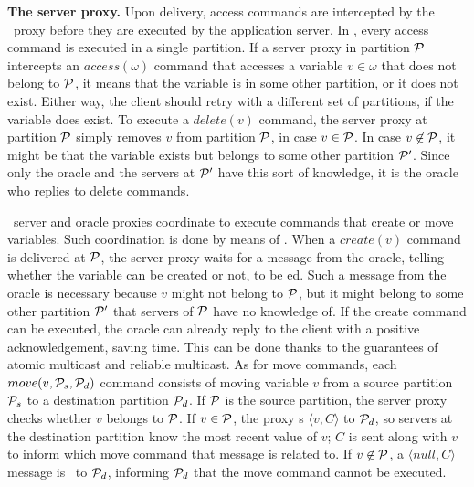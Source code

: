 

\textbf{The server proxy.} Upon delivery, access commands are intercepted by the \dssmr\ proxy before they are executed by the application server.
In \dssmr{}, every access command is executed in a single partition.
If a server proxy in partition $\mathcal{P}$ intercepts an $access(\omega)$ command that accesses a variable $v \in \omega$ that does not belong to $\mathcal{P}$, it means that the variable is in some other partition, or it does not exist.
Either way, the client should retry with a different set of partitions, if the variable does exist.
To execute a $delete(v)$ command, the server proxy at partition $\mathcal{P}$ simply removes $v$ from partition $\mathcal{P}$, in case $v \in \mathcal{P}$.
In case $v \not\in \mathcal{P}$, it might be that the variable exists but belongs to some other partition $\mathcal{P}'$.
Since only the oracle and the servers at $\mathcal{P}'$ have this sort of knowledge, it is the oracle who replies to delete commands.

\dssmr\ server and oracle proxies coordinate to execute commands that create or move variables.
Such coordination is done by means of \rmcast{}.
When a $create(v)$ command is delivered at $\mathcal{P}$, the server proxy waits for a message from the oracle, telling whether the variable can be created or not, to be \rmdel{}ed.
Such a message from the oracle is necessary because $v$ might not belong to $\mathcal{P}$, but it might belong to some other partition $\mathcal{P}'$ that servers of $\mathcal{P}$ have no knowledge of.
If the create command can be executed, the oracle can already reply to the client with a positive acknowledgement, saving time.
This can be done thanks to the guarantees of atomic multicast and reliable multicast.
As for move commands, each $move(v,\mathcal{P}_s,\mathcal{P}_d)$ command consists of moving variable $v$ from a source partition $\mathcal{P}_s$ to a destination partition $\mathcal{P}_d$.
If $\mathcal{P}$ is the source partition, the server proxy checks whether $v$ belongs to $\mathcal{P}$.
If $v \in \mathcal{P}$, the proxy \rmcast{}s $\langle v, C \rangle$ to $\mathcal{P}_d$, so servers at the destination partition know the most recent value of $v$; $C$ is sent along with $v$ to inform which move command that message is related to.
If $v \not\in \mathcal{P}$, a $\langle null, C \rangle$ message is \rmcast\ to $\mathcal{P}_d$, informing $\mathcal{P}_d$ that the move command cannot be executed.



